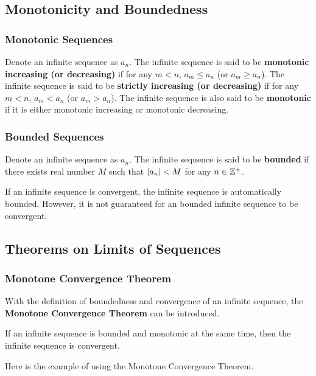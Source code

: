 \documentclass[a4paper,12pt]{article}
\begin{document}
\subsection{Monotonicity and Boundedness}
\subsubsection{Monotonic Sequences}
\begin{dft}
  Denote an infinite sequence as $a_{n}$. The infinite sequence is said to be \textbf{monotonic increasing (or decreasing)} if for any $m<n$, $a_{m}\leq a_{n}$ (or $a_{m}\geq a_{n}$). The infinite sequence is said to be \textbf{strictly increasing (or decreasing)} if for any $m<n$, $a_{m}<a_{n}$ (or $a_{m}>a_{n}$). The infinite sequence is also said to be \textbf{monotonic} if it is either monotonic increasing or monotonic decreasing.
\end{dft}

\subsubsection{Bounded Sequences}
\begin{dft}
  Denote an infinite sequence as $a_{n}$. The infinite sequence is said to be \textbf{bounded} if there exists real number $M$ such that $\left| a_{n}\right|<M$ for any $n\in\mathbb{Z}^{+}$.
\end{dft}\n

If an infinite sequence is convergent, the infinite sequence is automatically bounded. However, it is not guaranteed for an bounded infinite sequence to be convergent.

\subsection{Theorems on Limits of Sequences}
\subsubsection{Monotone Convergence Theorem}
With the definition of boundedness and convergence of an infinite sequence, the \textbf{Monotone Convergence Theorem} can be introduced.\n

\begin{thm}
  If an infinite sequence is bounded and monotonic at the same time, then the infinite sequence is convergent.
\end{thm}\n

Here is the example of using the Monotone Convergence Theorem.\n
\end{document}
